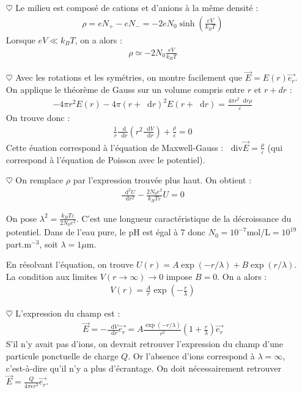 \documentclass{report}
\newcommand*\dif{\mathop{}\!\mathrm{d}}
\newcommand*\diver{\mathop{}\!\mathrm{div}}
\begin{document}
\begin{itemize}

	\item[$\heartsuit$] Le milieu est composé de cations et d'anions à la même densité :
	\begin{align*}
		\rho=eN_+-eN_-=-2eN_0\sinh\left( \frac{eV}{k_BT}\right) 
	\end{align*}
Lorsque $eV\ll k_BT$, on a alors : 
\begin{align*}
	\rho\simeq -2N_0\frac{eV}{k_BT}
\end{align*}

	\item[$\heartsuit$] Avec les rotations et les symétries, on montre facilement que $\vec{E}=E(r)\vec{e_r}$. On applique le théorème de Gauss sur un volume compris entre $r$ et $r+dr$ :
	\begin{align*}
		-4\pi r^2E(r)-4\pi(r+\dif r)^2E(r+\dif r)=\frac{4\pi r^2\dif r\rho}{\varepsilon}
	\end{align*}
	On trouve donc :
	\begin{align*}
		\frac{1}{r}\frac{\dif}{\dif r}\left( r^2\frac{\dif V}{\dif r}\right) +\frac{\rho}{\epsilon}=0
	\end{align*}
	Cette éuation correspond à l'équation de Maxwell-Gauss : $\diver\vec{E}=\frac{\rho}{\varepsilon}$ (qui correspond à l'équation de Poisson avec le potentiel).

	\item[$\heartsuit$] On remplace $\rho$ par l'expression trouvée plus haut. On obtient : 
	\begin{align*}
		\frac{\dif^2U}{\dif r^2}-\frac{2N_0e^2}{k_BT\varepsilon}U=0
	\end{align*}
	
	On pose $\lambda^2 = \frac{k_BT\varepsilon}{2N_0e^2}$. C'est une longueur caractéristique de la décroissance du potentiel. Dans de l'eau pure, le pH est égal à 7 donc $N_0=10^{-7}$mol/L$=10^{19}$part.m$^{-3}$, soit $\lambda=1\mu$m.
	
	En résolvant l'équation, on trouve $U(r)=A\exp\left(-r/\lambda \right) +B\exp\left(r/\lambda\right)$. La condition aux limites $V(r\longrightarrow\infty)\longrightarrow0$ impose $B=0$. On a alors :
	\begin{align*}
		V(r)=\frac{A}{r}\exp\left(-\frac{r}{\lambda} \right) 
	\end{align*}
	
	\item[$\heartsuit$] L'expression du champ est :
	\begin{align*}
		\vec{E}=-\frac{\dif V}{\dif r}\vec{e_r}=A\frac{\exp(-r/\lambda)}{r^2}\left(1+\frac{r}{\lambda}\right)\vec{e_r}
	\end{align*}
	S'il n'y avait pas d'ions, on devrait retrouver l'expression du champ d'une particule ponctuelle de charge $Q$. Or l'absence d'ions correspond à $\lambda=\infty$, c'est-à-dire qu'il n'y a plus d'écrantage. On doit nécessairement retrouver $\vec{E}=\frac{Q}{4\pi\epsilon r^2}\vec{e_r}$.
	

\end{itemize}
\end{document}
